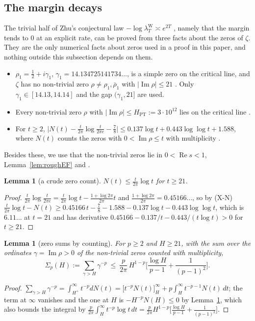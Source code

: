 \documentclass[11pt]{amsart}
\newtheorem{lemma}[theorem]{Lemma}
\theoremstyle{definition}
\theoremstyle{remark}
\newcommand{\Rel}{\operatorname{Re}}
\newcommand{\Iml}{\operatorname{Im}}
\newcommand{\lamW}{\lambda^{\mathrm W}_T}
\begin{document}
\subsection{The margin decays}\label{subsec:margin}

The trivial half of Zhu's conjectural law $-\log\lamW\asymp e^{2T}$ \cite[Conj.~12.1]{Zhu2026}, namely that
the margin tends to $0$ at an explicit rate, can be proved from three facts about the zeros of $\zeta$.
They are the only numerical facts about zeros used in a proof in this paper, and nothing outside this
subsection depends on them.
\begin{itemize}
\item[(X19)] $\rho_1=\frac12+i\gamma_1$, $\gamma_1=14.134725141734\ldots$, is a simple zero on the critical line,
and $\zeta$ has no non-trivial zero $\rho\ne\rho_1,\bar\rho_1$ with $|\Iml\rho|\le21$
\cite{RosserYoheSchoenfeld1968,PlattTrudgian2021}. Only $\gamma_1\in[14.13,14.14]$ and the gap $(\gamma_1,21]$
are used.
\item[(X19$'$)] Every non-trivial zero $\rho$ with $|\Iml\rho|\le H_{\mathrm{PT}}:=3\cdot10^{12}$ lies on the
critical line \cite{PlattTrudgian2021}.
\item[(X-N)] For $t\ge2$, $\big|N(t)-\frac t{2\pi}\log\frac t{2\pi e}-\frac78\big|\le0.137\log t+0.443\log\log t+1.588$,
where $N(t)$ counts the zeros with $0<\Iml\rho\le t$ with multiplicity \cite[Thm.~19]{Rosser1941}.
\end{itemize}
Besides these, we use that the non-trivial zeros lie in $0<\Rel s<1$, Lemma~\ref{lem:roughEF} and
\cite[Thm.~11.3]{Paper45}.
\begin{lemma}[a crude zero count]\label{lem:Ncount}
$N(t)\le\frac t{2\pi}\log t$ for $t\ge21$.
\end{lemma}
\begin{proof}
$\frac t{2\pi}\log\frac t{2\pi e}=\frac t{2\pi}\log t-\frac{1+\log2\pi}{2\pi}t$ and
$\frac{1+\log2\pi}{2\pi}=0.45166\ldots$, so by (X-N)
$\frac t{2\pi}\log t-N(t)\ge0.45166\,t-\frac78-1.588-0.137\log t-0.443\log\log t$, which is $6.11\ldots$ at
$t=21$ and has derivative $0.45166-0.137/t-0.443/(t\log t)>0$ for $t\ge21$.
\end{proof}

\begin{lemma}[zero sums by counting]\label{lem:zerosum}
For $p\ge2$ and $H\ge21$, with the sum over the ordinates $\gamma=\Iml\rho>0$ of the non-trivial zeros
counted with multiplicity,
\[
\Sigma_p(H):=\sum_{\gamma>H}\gamma^{-p}\ \le\ \frac p{2\pi}\,H^{1-p}\Big[\frac{\log H}{p-1}+\frac1{(p-1)^2}\Big].
\]
\end{lemma}
\begin{proof}
$\sum_{\gamma>H}\gamma^{-p}=\int_{H^+}^\infty t^{-p}dN(t)=\big[t^{-p}N(t)\big]_H^\infty+p\int_H^\infty t^{-p-1}N(t)\,dt$;
the term at $\infty$ vanishes and the one at $H$ is $-H^{-p}N(H)\le0$ by Lemma~\ref{lem:Ncount}, which
also bounds the integral by $\frac p{2\pi}\int_H^\infty t^{-p}\log t\,dt=\frac p{2\pi}H^{1-p}\big[\frac{\log H}{p-1}+\frac1{(p-1)^2}\big]$.
\end{proof}
\end{document}
